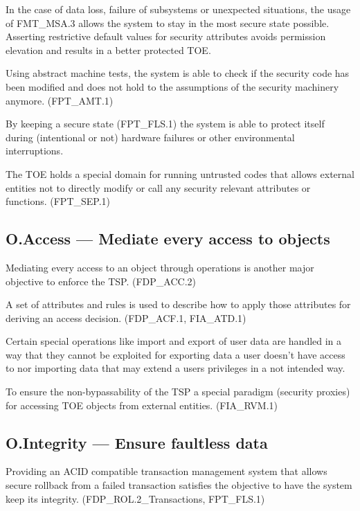 \documentclass[12pt,english]{scrbook}
\begin{document}
    In the case of data loss, failure of subsystems or unexpected situations,
    the usage of FMT\_MSA.3 allows the system to stay in the most secure state
    possible. Asserting restrictive default values for security attributes
    avoids permission elevation and results in a better protected TOE.
    
    Using abstract machine tests, the system is able to check if the security
    code has been modified and does not hold to the assumptions of the security
    machinery anymore. (FPT\_AMT.1)

    By keeping a secure state (FPT\_FLS.1) the system is able to protect itself
    during (intentional or not) hardware failures or other environmental
    interruptions.
    
    The TOE holds a special domain for running untrusted codes that allows
    external entities not to directly modify or call any security relevant
    attributes or functions. (FPT\_SEP.1)

\subsection{O.Access --- Mediate every access to objects}

    Mediating every access to an object through operations is another major
    objective to enforce the TSP. (FDP\_ACC.2)

    A set of attributes and rules is used to describe how to apply those
    attributes for deriving an access decision. (FDP\_ACF.1, FIA\_ATD.1)  

    Certain special operations like import and export of user data are handled
    in a way that they cannot be exploited for exporting data a user doesn't
    have access to nor importing data that may extend a users privileges in a
    not intended way. 

    To ensure the non-bypassability of the TSP a special paradigm (security
    proxies) for accessing TOE objects from external entities. (FIA\_RVM.1)
    
\subsection{O.Integrity --- Ensure faultless data}

    Providing an ACID compatible transaction management system that allows
    secure rollback from a failed transaction satisfies the objective to have
    the system keep its integrity. (FDP\_ROL.2\_Transactions, FPT\_FLS.1)
\end{document}
